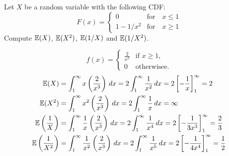 \begin{exercise}
\begin{questions}
%


\question

Let $X$ be a random variable with the following CDF:
\[
F(x) = \begin{cases}
	0					& \text{for}\quad x\leq 1 \\
	1 - 1/x^{2}	& \text{for}\quad x\geq 1
\end{cases}
\]
Compute $\mathbb{E}(X)$, $\mathbb{E}(X^2)$, $\mathbb{E}(1/X)$ and $\mathbb{E}(1/X^2)$.
\begin{answer}
\[
f(x) = \begin{cases}
	\frac{2}{x^3}	& \text{if } x\geq 1, \\
	0 				& \text{otherwisee.}
\end{cases}
\]
\begin{align*}
\mathbb{E}(X)	
	& = \int_{1}^{\infty}x\left(\frac{2}{x^3}\right)\,dx 
		= 2\int_{1}^{\infty}\frac{1}{x^2}\,dx
		= 2\left[-\frac{1}{x}\right]_{1}^{\infty}
		= 2 \\
\mathbb{E}(X^2)
	& = \int_{1}^{\infty}x^2\left(\frac{2}{x^3}\right)\,dx 
		= 2\int_{1}^{\infty}\frac{1}{x}\,dx
		= \infty \\	
\mathbb{E}\left(\frac{1}{X}\right)	
	& = \int_{1}^{\infty}\frac{1}{x}\left(\frac{2}{x^3}\right)\,dx 
		= 2\int_{1}^{\infty}\frac{1}{x^4}\,dx
		= 2\left[-\frac{1}{3x^3}\right]_{1}^{\infty}
		= \frac{2}{3} \\
\mathbb{E}\left(\frac{1}{X^2}\right)	
	& = \int_{1}^{\infty}\frac{1}{x^2}\left(\frac{2}{x^3}\right)\,dx 
		= 2\int_{1}^{\infty}\frac{1}{x^5}\,dx
		= 2\left[-\frac{1}{4x^4}\right]_{1}^{\infty}
		= \frac{1}{2} \\
\end{align*}
\end{answer} 



\end{questions}
\end{exercise}
